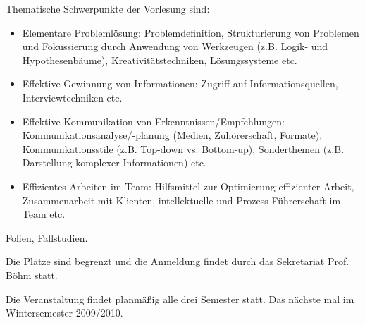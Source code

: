 \begin{course}
\begin{content}
Thematische Schwerpunkte der Vorlesung sind:

 \begin{itemize}\item Elementare Problemlösung: Problemdefinition, Strukturierung von Problemen und Fokussierung durch Anwendung von Werkzeugen (z.B. Logik- und Hypothesenbäume), Kreativitätstechniken, Lösungssysteme etc.  \item Effektive Gewinnung von Informationen: Zugriff auf Informationsquellen, Interviewtechniken etc.  \item Effektive Kommunikation von Erkenntnissen/Empfehlungen: Kommunikationsanalyse/-planung (Medien, Zuhörerschaft, Formate), Kommunikationsstile (z.B. Top-down vs. Bottom-up), Sonderthemen (z.B. Darstellung komplexer Informationen) etc.  \item Effizientes Arbeiten im Team: Hilfsmittel zur Optimierung effizienter Arbeit, Zusammenarbeit mit Klienten, intellektuelle und Prozess-Führerschaft im Team etc.  \end{itemize}
\end{content}

\begin{media}Folien, Fallstudien.

\end{media}



\begin{remarks}Die Plätze sind begrenzt und die Anmeldung findet durch das Sekretariat Prof. Böhm statt.

 

Die Veranstaltung findet planmäßig alle drei Semester statt. Das nächste mal im Wintersemester 2009/2010.

\end{remarks}

\end{course}